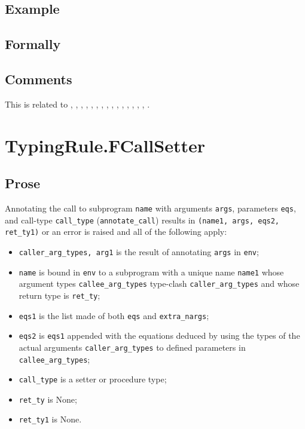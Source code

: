 \documentclass{book}
\begin{document}
\begin{itemize}
  \subsection{Example}



\begin{emptyformal}
    \subsection{Formally}
\end{emptyformal}

\subsection{Comments}
  This is related to , , ,
  , , , , ,
  , , , , ,
  , , .


\section{TypingRule.FCallSetter \label{sec:TypingRule.FCallSetter}}

  \subsection{Prose}
  Annotating the call to subprogram \texttt{name} with arguments \texttt{args},
  parameters \texttt{eqs}, and call-type \texttt{call\_type}
  (\texttt{annotate\_call}) results in \texttt{(name1, args, eqs2, ret\_ty1)}
  or an error is raised and all of the following apply:
  \begin{itemize}
    \item \texttt{caller\_arg\_types, arg1} is the result of annotating
      \texttt{args} in \texttt{env};
    \item \texttt{name} is bound in \texttt{env} to a subprogram with a unique
      name \texttt{name1} whose argument types \texttt{callee\_arg\_types}
      type-clash \texttt{caller\_arg\_types} and whose return type is
      \texttt{ret\_ty};
    \item \texttt{eqs1} is the list made of both \texttt{eqs} and
      \texttt{extra\_nargs};
    \item \texttt{eqs2} is \texttt{eqs1} appended with the equations deduced by
      using the types of the actual arguments \texttt{caller\_arg\_types} to
      defined parameters in \\ \texttt{callee\_arg\_types};
    \item \texttt{call\_type} is a setter or procedure type;
    \item \texttt{ret\_ty} is None;
    \item \texttt{ret\_ty1} is None.
  \end{itemize}


\end{itemize}
\end{document}
